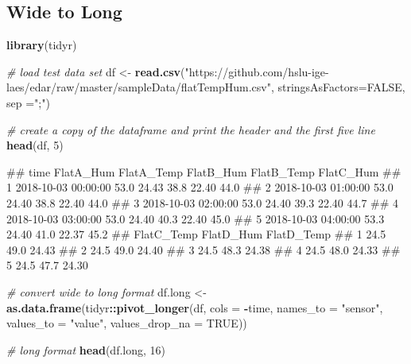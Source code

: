 \documentclass[
]{book}
\newenvironment{Shaded}{\begin{snugshade}}{\end{snugshade}}
\newcommand{\CommentTok}[1]{\textcolor[rgb]{0.56,0.35,0.01}{\textit{#1}}}
\newcommand{\DataTypeTok}[1]{\textcolor[rgb]{0.13,0.29,0.53}{#1}}
\newcommand{\DecValTok}[1]{\textcolor[rgb]{0.00,0.00,0.81}{#1}}
\newcommand{\KeywordTok}[1]{\textcolor[rgb]{0.13,0.29,0.53}{\textbf{#1}}}
\newcommand{\NormalTok}[1]{#1}
\newcommand{\OperatorTok}[1]{\textcolor[rgb]{0.81,0.36,0.00}{\textbf{#1}}}
\newcommand{\OtherTok}[1]{\textcolor[rgb]{0.56,0.35,0.01}{#1}}
\newcommand{\StringTok}[1]{\textcolor[rgb]{0.31,0.60,0.02}{#1}}
\let\oldShaded\Shaded
\let\endoldShaded\endShaded
\renewenvironment{Shaded}{\footnotesize\oldShaded}{\endoldShaded}
\let\oldverbatim\verbatim
\let\endoldverbatim\endverbatim
\renewenvironment{verbatim}{\footnotesize\oldverbatim}{\endoldverbatim}
\begin{document}
\hypertarget{wide-to-long}{%
\subsection{Wide to Long}\label{wide-to-long}}

\begin{Shaded}
\begin{Highlighting}[]
\KeywordTok{library}\NormalTok{(tidyr)}

\CommentTok{# load test data set}
\NormalTok{df <-}\StringTok{ }\KeywordTok{read.csv}\NormalTok{(}\StringTok{"https://github.com/hslu-ige-laes/edar/raw/master/sampleData/flatTempHum.csv"}\NormalTok{,}
               \DataTypeTok{stringsAsFactors=}\OtherTok{FALSE}\NormalTok{,}
               \DataTypeTok{sep =}\StringTok{";"}\NormalTok{)}

\CommentTok{# create a copy of the dataframe and print the header and the first five line}
\KeywordTok{head}\NormalTok{(df, }\DecValTok{5}\NormalTok{)}
\end{Highlighting}
\end{Shaded}

\begin{verbatim}
##                  time FlatA_Hum FlatA_Temp FlatB_Hum FlatB_Temp FlatC_Hum
## 1 2018-10-03 00:00:00      53.0      24.43      38.8      22.40      44.0
## 2 2018-10-03 01:00:00      53.0      24.40      38.8      22.40      44.0
## 3 2018-10-03 02:00:00      53.0      24.40      39.3      22.40      44.7
## 4 2018-10-03 03:00:00      53.0      24.40      40.3      22.40      45.0
## 5 2018-10-03 04:00:00      53.3      24.40      41.0      22.37      45.2
##   FlatC_Temp FlatD_Hum FlatD_Temp
## 1       24.5      49.0      24.43
## 2       24.5      49.0      24.40
## 3       24.5      48.3      24.38
## 4       24.5      48.0      24.33
## 5       24.5      47.7      24.30
\end{verbatim}

\begin{Shaded}
\begin{Highlighting}[]
\CommentTok{# convert wide to long format}
\NormalTok{df.long <-}\StringTok{ }\KeywordTok{as.data.frame}\NormalTok{(tidyr}\OperatorTok{::}\KeywordTok{pivot_longer}\NormalTok{(df,}
                                             \DataTypeTok{cols =} \OperatorTok{-}\NormalTok{time,}
                                             \DataTypeTok{names_to =} \StringTok{"sensor"}\NormalTok{,}
                                             \DataTypeTok{values_to =} \StringTok{"value"}\NormalTok{,}
                                             \DataTypeTok{values_drop_na =} \OtherTok{TRUE}\NormalTok{))}

\CommentTok{# long format}
\KeywordTok{head}\NormalTok{(df.long, }\DecValTok{16}\NormalTok{)}
\end{Highlighting}
\end{Shaded}
\end{document}
